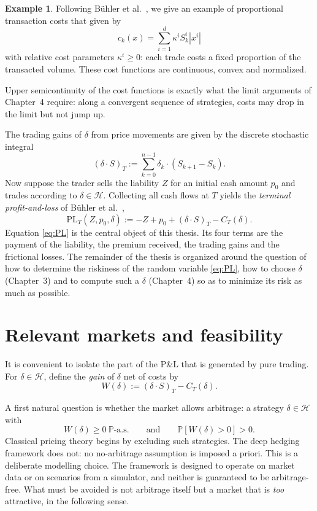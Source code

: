 \documentclass[11pt,a4paper]{report}
\numberwithin{equation}{chapter}
\theoremstyle{plain}
\theoremstyle{definition}
\newtheorem{example}[proposition]{Example}
\newcommand{\PP}{\mathbb{P}}
\newcommand{\HH}{\mathcal{H}}
\newcommand{\as}{\ \PP\text{-a.s.}}
\begin{document}
\begin{example}\label{ex:prop-costs}
    Following B\"uhler et al.\ \cite[Section~2]{buehler}, we give an example of proportional
    transaction costs that given by
    \[
        c_k(x)=\sum_{i=1}^d\kappa^i S_k^i|x^i|
    \]
    with relative cost parameters $\kappa^i\ge0$: each trade costs a fixed proportion of the transacted volume. These cost functions are continuous, convex and normalized.
\end{example}

\noindent Upper semicontinuity of the cost functions is exactly what the limit arguments of Chapter~4 require: along a convergent sequence of strategies, costs may drop in the limit but not jump up.

The trading gains of $\delta$ from price movements are given by the discrete stochastic integral
\[
    (\delta\cdot S)_T:=\sum_{k=0}^{n-1}\delta_k\cdot(S_{k+1}-S_k).
\]
Now suppose the trader sells the liability $Z$ for an initial cash amount $p_0$ and trades according to $\delta\in\HH$. Collecting all cash flows at $T$ yields the \emph{terminal profit-and-loss} of B\"uhler et al.\ \cite[Equation~(1)]{buehler},
\begin{equation}\label{eq:PL}
    \mathrm{PL}_T(Z,p_0,\delta):=-Z+p_0+(\delta\cdot S)_T-C_T(\delta).
\end{equation}
Equation \eqref{eq:PL} is the central object of this thesis. Its four terms are the payment of the liability, the premium received, the trading gains and the frictional losses. The remainder of the thesis is organized around the question of how to determine the riskiness of the random variable \eqref{eq:PL}, how to choose $\delta$ (Chapter~3) and to compute such a $\delta$ (Chapter~4) so as to minimize its risk as much as possible.

\section{Relevant markets and feasibility}\label{sec:arbitrage}

It is convenient to isolate the part of the P\&L that is generated by pure trading. For $\delta\in\HH$, define the \emph{gain} of $\delta$ net of costs by
\[
    W(\delta):=(\delta\cdot S)_T-C_T(\delta).
\]

A first natural question is whether the market allows arbitrage: a strategy $\delta\in\HH$ with
\[
    W(\delta)\ge0\as\qquad\text{and}\qquad\PP[W(\delta)>0]>0.
\]
Classical pricing theory begins by excluding such strategies. The deep hedging framework does not: no no-arbitrage assumption is imposed a priori. This is a deliberate modelling choice. The framework is designed to operate on market data or on scenarios from a simulator, and neither is guaranteed to be arbitrage-free. What must be avoided is not arbitrage itself but a market that is \emph{too} attractive, in the following sense.
\end{document}
